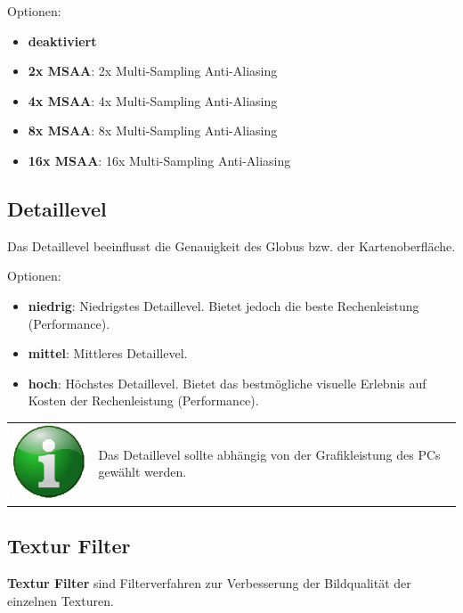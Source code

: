 \documentclass[10pt]{scrreprt}
\begin{document}
Optionen:
\begin{itemize}
\item \textbf{deaktiviert}
\item \textbf{2x MSAA}: 2x Multi-Sampling Anti-Aliasing
\item \textbf{4x MSAA}: 4x Multi-Sampling Anti-Aliasing
\item \textbf{8x MSAA}: 8x Multi-Sampling Anti-Aliasing
\item \textbf{16x MSAA}: 16x Multi-Sampling Anti-Aliasing
\end{itemize}


\vspace{3mm}
\subsection{Detaillevel}  
Das Detaillevel beeinflusst die Genauigkeit des Globus bzw. der Kartenoberfläche. 

\vspace{3mm}
Optionen:
\begin{itemize}
\item \textbf{niedrig}: Niedrigstes Detaillevel. Bietet jedoch die beste Rechenleistung (Performance).
\item \textbf{mittel}: Mittleres Detaillevel.
\item \textbf{hoch}: Höchstes Detaillevel. Bietet das bestmögliche visuelle Erlebnis auf Kosten der Rechenleistung (Performance).
\end{itemize}

\vspace{3mm}
\begin{tabular}{>{\centering \arraybackslash}m{1cm} m{14cm}}
\includegraphics[scale=0.5]{images/info.eps} & Das Detaillevel sollte abhängig von der Grafikleistung des PCs gewählt werden. \\
\end{tabular}


\newpage
\subsection{Textur Filter}  
\textbf{Textur Filter} sind Filterverfahren zur Verbesserung der Bildqualität der einzelnen Texturen.\\
\end{document}
